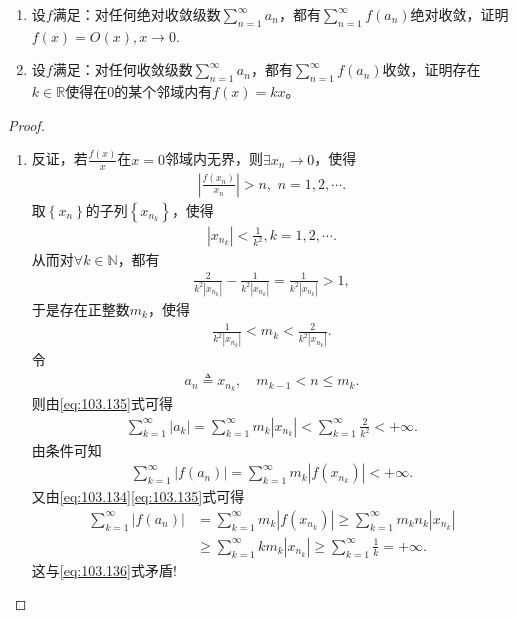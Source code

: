 \documentclass[../../main.tex]{subfiles}%
\begin{document}
\begin{example}
\begin{enumerate}
\item 设$f$满足：对任何绝对收敛级数$\sum_{n=1}^{\infty} a_n$，都有$\sum_{n=1}^{\infty} f(a_n)$绝对收敛，证明$f(x) = O(x),x\to 0$.

\item 设$f$满足：对任何收敛级数$\sum_{n=1}^{\infty} a_n$，都有$\sum_{n=1}^{\infty} f(a_n)$收敛，证明存在$k \in \mathbb{R}$使得在0的某个邻域内有$f(x) = kx$。
\end{enumerate}
\end{example}
\begin{proof}
\begin{enumerate}
\item 反证，若$\frac{f\left( x \right)}{x}$在$x=0$邻域内无界，则$\exists x_n\rightarrow 0$，使得
\begin{align}
\left| \frac{f\left( x_n \right)}{x_n} \right|>n,\,\,n=1,2,\cdots .
\label{eq:103.134}
\end{align}
取$\left\{ x_n \right\}$的子列$\left\{ x_{n_k} \right\}$，使得
\begin{align*}
\left| x_{n_k} \right|<\frac{1}{k^2},k=1,2,\cdots .
\end{align*}
从而对$\forall k\in \mathbb{N}$，都有
\begin{align*}
\frac{2}{k^2\left| x_{n_k} \right|}-\frac{1}{k^2\left| x_{n_k} \right|}=\frac{1}{k^2\left| x_{n_k} \right|}>1,
\end{align*}
于是存在正整数$m_k$，使得
\begin{align}
\frac{1}{k^2\left| x_{n_k} \right|}<m_k<\frac{2}{k^2\left| x_{n_k} \right|}.
\label{eq:103.135}
\end{align}
令
\begin{align*}
a_n\triangleq x_{n_k},\quad m_{k-1}<n\leqslant m_k.
\end{align*}
则由\eqref{eq:103.135}式可得
\begin{align*}
\sum_{k=1}^{\infty}{\left| a_k \right|}=\sum_{k=1}^{\infty}{m_k\left| x_{n_k} \right|}<\sum_{k=1}^{\infty}{\frac{2}{k^2}}<+\infty .
\end{align*}
由条件可知
\begin{align}
\sum_{k=1}^{\infty}{\left| f\left( a_n \right) \right|}=\sum_{k=1}^{\infty}{m_k\left| f\left( x_{n_k} \right) \right|}<+\infty .
\label{eq:103.136}
\end{align}
又由\eqref{eq:103.134}\eqref{eq:103.135}式可得
\begin{align*}
\sum_{k=1}^{\infty}{\left| f\left( a_n \right) \right|}&=\sum_{k=1}^{\infty}{m_k\left| f\left( x_{n_k} \right) \right|}\geqslant \sum_{k=1}^{\infty}{m_kn_k\left| x_{n_k} \right|}\\
&\geqslant \sum_{k=1}^{\infty}{km_k\left| x_{n_k} \right|}\geqslant \sum_{k=1}^{\infty}{\frac{1}{k}}=+\infty .
\end{align*}
这与\eqref{eq:103.136}式矛盾!


\end{enumerate}
\end{proof}
\end{document}
